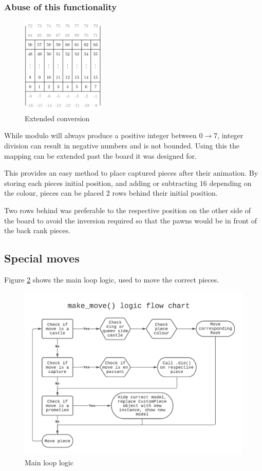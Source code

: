 \documentclass[11pt]{article}
\begin{document}
\subsubsection{Abuse of this functionality}
\label{sec:org1fa3750}
\begin{figure}
\centering
\includegraphics[width=0.35\textwidth]{Images/tikzit_image0.png}
\caption{\label{extended-array}Extended conversion}
\end{figure}

While modulo will always produce a positive integer between \(0 \to 7\), integer
division can result in negative numbers and is not bounded. Using this the mapping
can be extended past the board it was designed for.

This provides an easy method to place captured pieces after their animation. By
storing each pieces initial position, and adding or subtracting \(16\) depending on
the colour, pieces can be placed \(2\) rows behind their initial position.

Two rows behind was preferable to the respective position on the other side of
the board to avoid the inversion required so that the pawns would be in front of the
back rank pieces.

\newpage
\subsection{Special moves}
\label{sec:org274f0d1}
Figure \ref{flowchart} shows the main loop logic, used to move the correct pieces.
\begin{figure}[htbp]
\centering
\includegraphics[width=\textwidth]{flowchart.pdf}
\caption{\label{flowchart}Main loop logic}
\end{figure}
\end{document}
